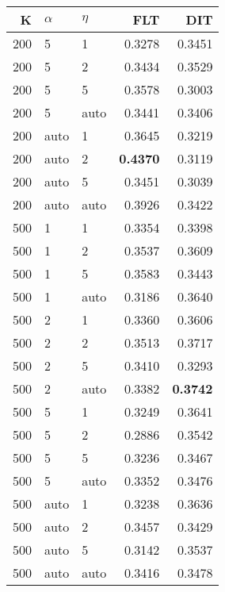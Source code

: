 \begin{table}
\begin{spacing}{1.2}
{\begin{tabular}{rll|rr}
\bottomrule
\end{tabular}
} \hfill \parbox{.45\linewidth}{\centering \begin{tabular}{rll|rr}
\toprule
   K & $\alpha$ &   $\eta$ & FLT &       DIT \\
\midrule
 200 &     5 &     1 &           0.3278 &       0.3451 \\
 200 &     5 &     2 &           0.3434 &       0.3529 \\
 200 &     5 &     5 &           0.3578 &       0.3003 \\
 200 &     5 &  auto &           0.3441 &       0.3406 \\
 200 &  auto &     1 &           0.3645 &       0.3219 \\
 200 &  auto &     2 &     {\bf 0.4370} &       0.3119 \\
 200 &  auto &     5 &           0.3451 &       0.3039 \\
 200 &  auto &  auto &           0.3926 &       0.3422 \\
 500 &     1 &     1 &           0.3354 &       0.3398 \\
 500 &     1 &     2 &           0.3537 &       0.3609 \\
 500 &     1 &     5 &           0.3583 &       0.3443 \\
 500 &     1 &  auto &           0.3186 &       0.3640 \\
 500 &     2 &     1 &           0.3360 &       0.3606 \\
 500 &     2 &     2 &           0.3513 &       0.3717 \\
 500 &     2 &     5 &           0.3410 &       0.3293 \\
 500 &     2 &  auto &           0.3382 & {\bf 0.3742} \\
 500 &     5 &     1 &           0.3249 &       0.3641 \\
 500 &     5 &     2 &           0.2886 &       0.3542 \\
 500 &     5 &     5 &           0.3236 &       0.3467 \\
 500 &     5 &  auto &           0.3352 &       0.3476 \\
 500 &  auto &     1 &           0.3238 &       0.3636 \\
 500 &  auto &     2 &           0.3457 &       0.3429 \\
 500 &  auto &     5 &           0.3142 &       0.3537 \\
 500 &  auto &  auto &           0.3416 &       0.3478 \\
\bottomrule
\end{tabular}
}
\end{spacing}
\end{table}
